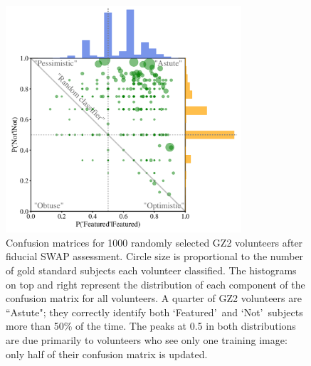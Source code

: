 \documentclass[twocolumn,  trackchanges,]{aastex6}%
\newcommand{\feat}{`Featured'}
\newcommand{\notfeat}{`Not'}
\begin{document}
\begin{figure}[t!]
\includegraphics[width=3.45in]{f2.pdf}
\caption{Confusion matrices for 1000 randomly selected GZ2 volunteers after fiducial SWAP assessment. Circle size is proportional to the number of gold standard subjects each volunteer classified. The histograms on top and right represent the distribution of each component of the confusion matrix for all volunteers.  A quarter of GZ2 volunteers are ``Astute"; they correctly identify both \feat~and \notfeat~subjects more than 50\% of the time. The peaks at 0.5 in both distributions are due primarily to volunteers who see only one training image: only half of their confusion matrix is updated. \label{fig: volunteer training}}
\end{figure}
\end{document}
